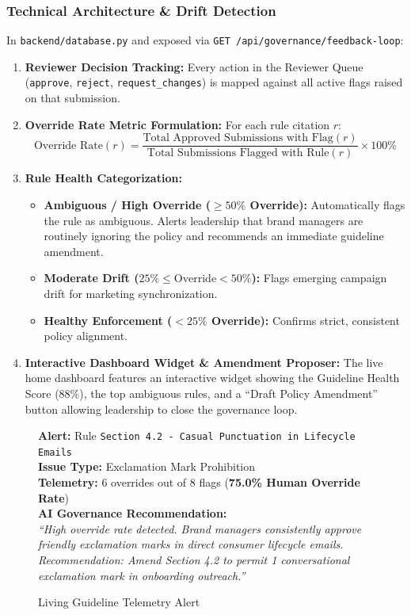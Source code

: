 \documentclass[11pt,a4paper]{article}
\begin{document}
\subsubsection{Technical Architecture \& Drift Detection}
In \texttt{backend/database.py} and exposed via \texttt{GET /api/governance/feedback-loop}:
\begin{enumerate}[leftmargin=1cm]
    \item \textbf{Reviewer Decision Tracking:} Every action in the Reviewer Queue (\texttt{approve}, \texttt{reject}, \texttt{request\_changes}) is mapped against all active flags raised on that submission.
    \item \textbf{Override Rate Metric Formulation:}
    For each rule citation $r$:
    \begin{equation}
        \text{Override Rate}(r) = \frac{\text{Total Approved Submissions with Flag}(r)}{\text{Total Submissions Flagged with Rule}(r)} \times 100\%
    \end{equation}
    \item \textbf{Rule Health Categorization:}
    \begin{itemize}
        \item \textbf{Ambiguous / High Override ($\ge 50\%$ Override):} Automatically flags the rule as ambiguous. Alerts leadership that brand managers are routinely ignoring the policy and recommends an immediate guideline amendment.
        \item \textbf{Moderate Drift ($25\% \le \text{Override} < 50\%$):} Flags emerging campaign drift for marketing synchronization.
        \item \textbf{Healthy Enforcement ($< 25\%$ Override):} Confirms strict, consistent policy alignment.
    \end{itemize}
    \item \textbf{Interactive Dashboard Widget \& Amendment Proposer:}
    The live home dashboard features an interactive widget showing the Guideline Health Score ($88\%$), the top ambiguous rules, and a ``Draft Policy Amendment'' button allowing leadership to close the governance loop.
\end{enumerate}

\begin{figure}[H]
\centering
\begin{tcolorbox}[colback=dangerred!5, colframe=dangerred, title=\textbf{Sample Ambiguous Guideline Alert Generated by Feedback Loop}]
\textbf{Alert:} Rule \texttt{Section 4.2 - Casual Punctuation in Lifecycle Emails}\\
\textbf{Issue Type:} Exclamation Mark Prohibition\\
\textbf{Telemetry:} 6 overrides out of 8 flags (\textbf{75.0\% Human Override Rate})\\
\textbf{AI Governance Recommendation:}\\
\textit{``High override rate detected. Brand managers consistently approve friendly exclamation marks in direct consumer lifecycle emails. Recommendation: Amend Section 4.2 to permit 1 conversational exclamation mark in onboarding outreach.''}
\end{tcolorbox}
\caption{Living Guideline Telemetry Alert}
\end{figure}
\end{document}
